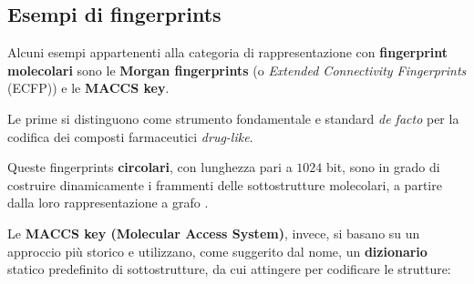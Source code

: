 \subsection{Esempi di fingerprints}
Alcuni esempi appartenenti alla categoria di rappresentazione con \textbf{fingerprint molecolari} sono le \textbf{Morgan fingerprints} (o \textit{Extended Connectivity Fingerprints} (ECFP)) e le \textbf{MACCS key}.

Le prime si distinguono come strumento fondamentale e standard \textit{de facto} per la codifica dei composti farmaceutici \textit{drug-like}. 

Queste fingerprints \textbf{circolari}, con lunghezza pari a $1024$ bit, sono in grado di costruire dinamicamente i frammenti delle sottostrutture molecolari, a partire dalla loro rappresentazione a grafo \cite{boldiniEffectivenessMolecularFingerprints2024}.

Le \textbf{MACCS key (Molecular Access System)}, invece, si basano su un approccio più storico e utilizzano, come suggerito dal nome, un \textbf{dizionario} statico predefinito di sottostrutture, da cui attingere per codificare le strutture:

